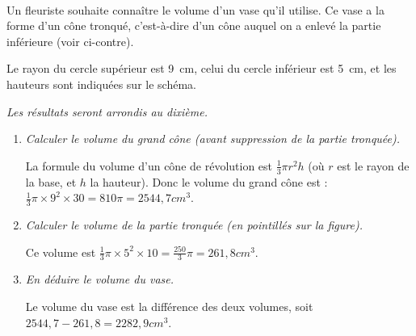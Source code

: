 \documentclass[12pt]{article}
\begin{document}
\begin{exercice}~
  \begin{multicols}{2}
    \begin{em}
      Un fleuriste souhaite connaître le volume d'un vase qu'il utilise. Ce vase a la forme d'un cône tronqué, c'est-à-dire d'un cône auquel on a enlevé la partie inférieure (voir ci-contre).

      Le rayon du cercle supérieur est 9~cm, celui du cercle inférieur est 5~cm, et les hauteurs sont indiquées sur le schéma.
    \end{em}

    \columnbreak

    \begin{center}
    \end{center}
  \end{multicols}

  \emph{Les résultats seront arrondis au dixième.}

  \begin{enumerate}[(1)]
    \item \emph{Calculer le volume du grand cône (avant suppression de la partie tronquée).}
      
      La formule du volume d'un cône de révolution est $\frac{1}{3}\pi r^2h$ (où $r$ est le rayon de la base, et $h$ la hauteur). Donc le volume du grand cône est : $\frac{1}{3}\pi\times9^2\times30=810\pi=2544,7cm^3$.
    \item \emph{Calculer le volume de la partie tronquée (en pointillés sur la figure).}
      
      Ce volume est $\frac{1}{3}\pi\times5^2\times10=\frac{250}{3}\pi=261,8cm^3$.
    \item \emph{En déduire le volume du vase.}
      
      Le volume du vase est la différence des deux volumes, soit $2544,7-261,8=2282,9cm^3$.
  \end{enumerate}

\end{exercice}
\end{document}
